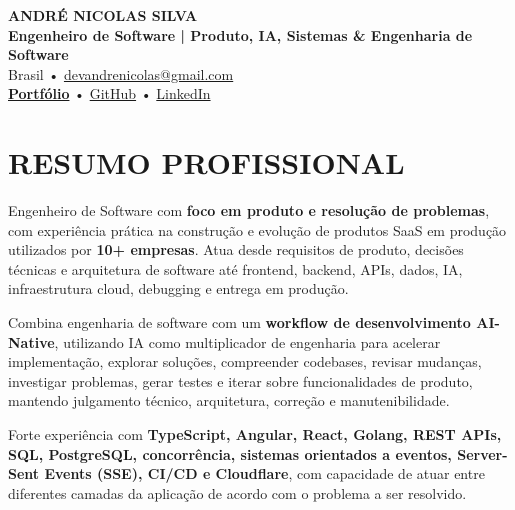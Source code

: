 \documentclass[10pt,a4paper]{article}
\begin{document}

\begin{center}

    {\LARGE \textbf{ANDRÉ NICOLAS SILVA}} \\[-2pt]

    {\normalsize \textbf{Engenheiro de Software | Produto, IA, Sistemas \& Engenharia de Software}} \\[1pt]

    \footnotesize
    Brasil \quad • \quad
    \href{mailto:devandrenicolas@gmail.com}{devandrenicolas@gmail.com} \\[-1pt]

    \textbf{\href{https://portfolio-andrenicolas.vercel.app}{Portfólio}}
    \quad • \quad
    \href{https://github.com/devAndreNicolas}{GitHub}
    \quad • \quad
    \href{https://www.linkedin.com/in/devandrenicolas}{LinkedIn}

\end{center}

\vspace{-3pt}


\section*{RESUMO PROFISSIONAL}

\footnotesize

Engenheiro de Software com \textbf{foco em produto e resolução de
problemas}, com experiência prática na construção e evolução de
produtos SaaS em produção utilizados por \textbf{10+ empresas}.
Atua desde requisitos de produto, decisões técnicas e arquitetura
de software até frontend, backend, APIs, dados, IA, infraestrutura
cloud, debugging e entrega em produção.

Combina engenharia de software com um \textbf{workflow de
desenvolvimento AI-Native}, utilizando IA como multiplicador de
engenharia para acelerar implementação, explorar soluções,
compreender codebases, revisar mudanças, investigar problemas,
gerar testes e iterar sobre funcionalidades de produto, mantendo
julgamento técnico, arquitetura, correção e manutenibilidade.

Forte experiência com \textbf{TypeScript, Angular, React, Golang,
REST APIs, SQL, PostgreSQL, concorrência, sistemas orientados a
eventos, Server-Sent Events (SSE), CI/CD e Cloudflare}, com
capacidade de atuar entre diferentes camadas da aplicação de acordo
com o problema a ser resolvido.
\end{document}
